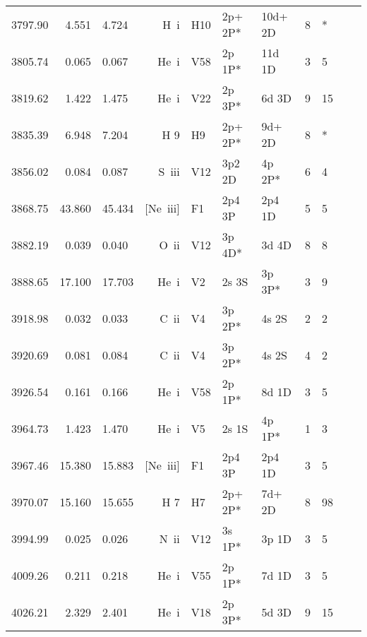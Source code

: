 \begin{longtable}{lrlrlllllll}
 3797.90 &   4.551 &   4.724 &  H~{\sc i}       &  H10       &  2p+ 2P*   &  10d+ 2D   &          8 &        *    \\
 3805.74 &   0.065 &   0.067 &  He~{\sc i}      &  V58       &  2p 1P*    &  11d 1D    &          3 &        5    \\
 3819.62 &   1.422 &   1.475 &  He~{\sc i}      &  V22       &  2p 3P*    &  6d 3D     &          9 &       15    \\
 3835.39 &   6.948 &   7.204 &  H 9       &  H9        &  2p+ 2P*   &  9d+ 2D    &          8 &        *          \\
 3856.02 &   0.084 &   0.087 &  S~{\sc iii}     &  V12       &  3p2 2D    &  4p 2P*    &          6 &        4    \\
 3868.75 &  43.860 &  45.434 &  [Ne~{\sc iii}]  &  F1        &  2p4 3P    &  2p4 1D    &          5 &        5    \\
 3882.19 &   0.039 &   0.040 &  O~{\sc ii}      &  V12       &  3p 4D*    &  3d 4D     &          8 &        8    \\
 3888.65 &  17.100 &  17.703 &  He~{\sc i}      &  V2        &  2s 3S     &  3p 3P*    &          3 &        9    \\
 3918.98 &   0.032 &   0.033 &  C~{\sc ii}      &  V4        &  3p 2P*    &  4s 2S     &          2 &        2    \\
 3920.69 &   0.081 &   0.084 &  C~{\sc ii}      &  V4        &  3p 2P*    &  4s 2S     &          4 &        2    \\
 3926.54 &   0.161 &   0.166 &  He~{\sc i}      &  V58       &  2p 1P*    &  8d 1D     &          3 &        5    \\
 3964.73 &   1.423 &   1.470 &  He~{\sc i}      &  V5        &  2s 1S     &  4p 1P*    &          1 &        3    \\
 3967.46 &  15.380 &  15.883 &  [Ne~{\sc iii}]  &  F1        &  2p4 3P    &  2p4 1D    &          3 &        5    \\
 3970.07 &  15.160 &  15.655 &  H 7       &  H7        &  2p+ 2P*   &  7d+ 2D    &          8 &       98          \\
 3994.99 &   0.025 &   0.026 &  N~{\sc ii}      &  V12       &  3s 1P*    &  3p 1D     &          3 &        5    \\
 4009.26 &   0.211 &   0.218 &  He~{\sc i}      &  V55       &  2p 1P*    &  7d 1D     &          3 &        5    \\
 4026.21 &   2.329 &   2.401 &  He~{\sc i}      &  V18       &  2p 3P*    &  5d 3D     &          9 &       15    \\

\end{longtable}
